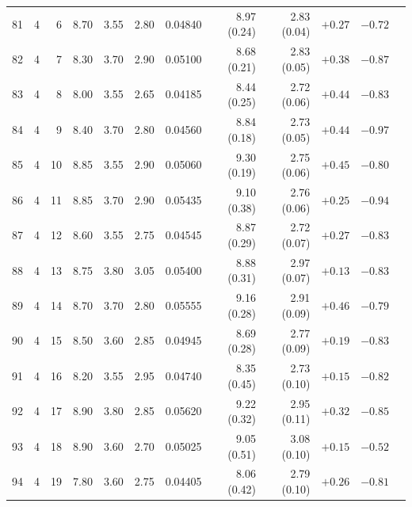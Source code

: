 \begin{longtable}{@{}rrrrrrrrrrrr@{}}
81 & 4 & 6 & \num{8.70} & \num{3.55} & \num{2.80} & \num{0.04840} & \num{8.97} (\num{0.24}) & \num{2.83} (\num{0.04}) & $+\num{0.27}$ & $-\num{0.72}$ &  \\
82 & 4 & 7 & \num{8.30} & \num{3.70} & \num{2.90} & \num{0.05100} & \num{8.68} (\num{0.21}) & \num{2.83} (\num{0.05}) & $+\num{0.38}$ & $-\num{0.87}$ &  \\
83 & 4 & 8 & \num{8.00} & \num{3.55} & \num{2.65} & \num{0.04185} & \num{8.44} (\num{0.25}) & \num{2.72} (\num{0.06}) & $+\num{0.44}$ & $-\num{0.83}$ &  \\
84 & 4 & 9 & \num{8.40} & \num{3.70} & \num{2.80} & \num{0.04560} & \num{8.84} (\num{0.18}) & \num{2.73} (\num{0.05}) & $+\num{0.44}$ & $-\num{0.97}$ &  \\
85 & 4 & 10 & \num{8.85} & \num{3.55} & \num{2.90} & \num{0.05060} & \num{9.30} (\num{0.19}) & \num{2.75} (\num{0.06}) & $+\num{0.45}$ & $-\num{0.80}$ &  \\
86 & 4 & 11 & \num{8.85} & \num{3.70} & \num{2.90} & \num{0.05435} & \num{9.10} (\num{0.38}) & \num{2.76} (\num{0.06}) & $+\num{0.25}$ & $-\num{0.94}$ &  \\
87 & 4 & 12 & \num{8.60} & \num{3.55} & \num{2.75} & \num{0.04545} & \num{8.87} (\num{0.29}) & \num{2.72} (\num{0.07}) & $+\num{0.27}$ & $-\num{0.83}$ &  \\
88 & 4 & 13 & \num{8.75} & \num{3.80} & \num{3.05} & \num{0.05400} & \num{8.88} (\num{0.31}) & \num{2.97} (\num{0.07}) & $+\num{0.13}$ & $-\num{0.83}$ &  \\
89 & 4 & 14 & \num{8.70} & \num{3.70} & \num{2.80} & \num{0.05555} & \num{9.16} (\num{0.28}) & \num{2.91} (\num{0.09}) & $+\num{0.46}$ & $-\num{0.79}$ &  \\
90 & 4 & 15 & \num{8.50} & \num{3.60} & \num{2.85} & \num{0.04945} & \num{8.69} (\num{0.28}) & \num{2.77} (\num{0.09}) & $+\num{0.19}$ & $-\num{0.83}$ &  \\
91 & 4 & 16 & \num{8.20} & \num{3.55} & \num{2.95} & \num{0.04740} & \num{8.35} (\num{0.45}) & \num{2.73} (\num{0.10}) & $+\num{0.15}$ & $-\num{0.82}$ &  \\
92 & 4 & 17 & \num{8.90} & \num{3.80} & \num{2.85} & \num{0.05620} & \num{9.22} (\num{0.32}) & \num{2.95} (\num{0.11}) & $+\num{0.32}$ & $-\num{0.85}$ &  \\
93 & 4 & 18 & \num{8.90} & \num{3.60} & \num{2.70} & \num{0.05025} & \num{9.05} (\num{0.51}) & \num{3.08} (\num{0.10}) & $+\num{0.15}$ & $-\num{0.52}$ &  \\
94 & 4 & 19 & \num{7.80} & \num{3.60} & \num{2.75} & \num{0.04405} & \num{8.06} (\num{0.42}) & \num{2.79} (\num{0.10}) & $+\num{0.26}$ & $-\num{0.81}$ &  \\

\end{longtable}
